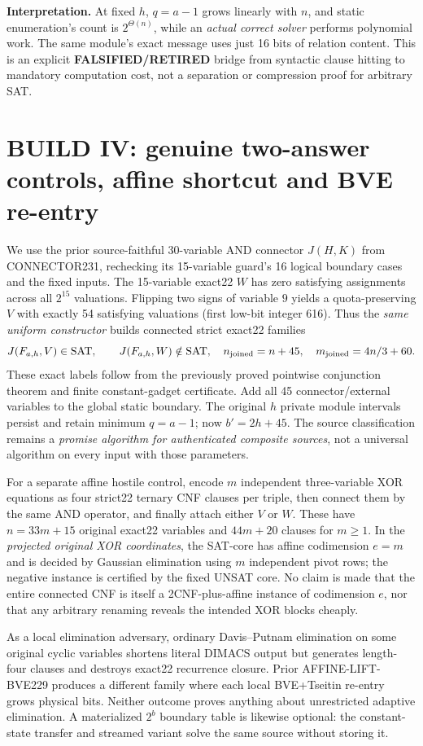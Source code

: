 \documentclass[10pt]{article}
\newcommand{\SAT}{\mathrm{SAT}}
\begin{document}
\noindent\textbf{Interpretation.} At fixed $h$, $q=a-1$ grows linearly with $n$, and static enumeration's count is $2^{\Theta(n)}$, while an \emph{actual correct solver} performs polynomial work. The same module's exact message uses just 16 bits of relation content. This is an explicit \textbf{FALSIFIED/RETIRED} bridge from syntactic clause hitting to mandatory computation cost, not a separation or compression proof for arbitrary SAT.

\section{BUILD IV: genuine two-answer controls, affine shortcut and BVE re-entry}
We use the prior source-faithful 30-variable AND connector $J(H,K)$ from CONNECTOR231, rechecking its 15-variable guard's 16 logical boundary cases and the fixed inputs. The 15-variable exact22 $W$ has zero satisfying assignments across all $2^{15}$ valuations. Flipping two signs of variable $9$ yields a quota-preserving $V$ with exactly 54 satisfying valuations (first low-bit integer 616). Thus the \emph{same uniform constructor} builds connected strict exact22 families
\[
 J(F_{a,h},V)\in\SAT,\qquad J(F_{a,h},W)\notin\SAT,
 \quad n_{\rm joined}=n+45,\quad m_{\rm joined}=4n/3+60.
\]
These exact labels follow from the previously proved pointwise conjunction theorem and finite constant-gadget certificate. Add all 45 connector/external variables to the global static boundary. The original $h$ private module intervals persist and retain minimum $q=a-1$; now $b'=2h+45$. The source classification remains a \emph{promise algorithm for authenticated composite sources}, not a universal algorithm on every input with those parameters.

For a separate affine hostile control, encode $m$ independent three-variable XOR equations as four strict22 ternary CNF clauses per triple, then connect them by the same AND operator, and finally attach either $V$ or $W$. These have $n=33m+15$ original exact22 variables and $44m+20$ clauses for $m\ge1$. In the \emph{projected original XOR coordinates}, the SAT-core has affine codimension $e=m$ and is decided by Gaussian elimination using $m$ independent pivot rows; the negative instance is certified by the fixed UNSAT core. No claim is made that the entire connected CNF is itself a 2CNF-plus-affine instance of codimension $e$, nor that any arbitrary renaming reveals the intended XOR blocks cheaply.

As a local elimination adversary, ordinary Davis--Putnam elimination on some original cyclic variables shortens literal DIMACS output but generates length-four clauses and destroys exact22 recurrence closure. Prior AFFINE-LIFT-BVE229 produces a different family where each local BVE+Tseitin re-entry grows physical bits. Neither outcome proves anything about unrestricted adaptive elimination. A materialized $2^b$ boundary table is likewise optional: the constant-state transfer and streamed variant solve the same source without storing it.
\end{document}
